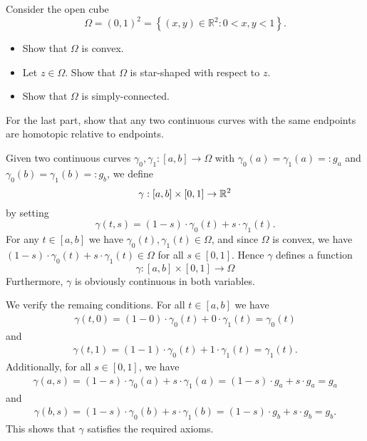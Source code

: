 \documentclass[11pt]{article}
\begin{document}
\begin{exercise}
    Consider the open cube 
    \[
        \Omega = (0,1)^2 = \left\{ (x,y) \in \mathbb R^2 : 0 < x,y < 1 \right\}. 
    \]
    \begin{itemize}
        \item Show that $\Omega$ is convex.
        \item Let $z \in \Omega$. Show that $\Omega$ is star-shaped with respect to $z$.
        \item Show that $\Omega$ is simply-connected.
    \end{itemize}
    For the last part, show that any two continuous curves with the same endpoints are homotopic relative to endpoints. 
\end{exercise}
\begin{solution}
    \item
    \item 
    \item 
    Given two continuous curves $\gamma_0, \gamma_1 : [a,b] \rightarrow \Omega$ with $\gamma_0(a) = \gamma_1(a) =: g_a$ and $\gamma_0(b) = \gamma_1(b) =: g_b$, we define 
    \[
        \gamma : [a,b] \times [0,1] \rightarrow \mathbb{R}^2
    \]
    by setting 
    \[
        \gamma(t,s) = (1-s) \cdot \gamma_0(t) + s \cdot \gamma_1(t).
    \]
    For any $t \in [a,b]$ we have $\gamma_0(t), \gamma_1(t) \in \Omega$,
    and since $\Omega$ is convex, we have $(1-s) \cdot \gamma_0(t) + s \cdot \gamma_1(t) \in \Omega$ for all $s \in [0,1]$.
    Hence $\gamma$ defines a function 
    \[
        \gamma : [a,b] \times [0,1] \rightarrow \Omega
    \]
    Furthermore, $\gamma$ is obviously continuous in both variables. 
    
    We verify the remaing conditions. For all $t \in [a,b]$ we have 
    \begin{align}
        \gamma(t,0) = (1-0) \cdot \gamma_0(t) + 0 \cdot \gamma_1(t) = \gamma_0(t)
    \end{align}
    and 
    \begin{align}
        \gamma(t,1) = (1-1) \cdot \gamma_0(t) + 1 \cdot \gamma_1(t) = \gamma_1(t)
        .
    \end{align}
    Additionally, for all $s \in [0,1]$, we have 
    \begin{align}
        \gamma(a,s) = (1-s) \cdot \gamma_0(a) + s \cdot \gamma_1(a) = (1-s) \cdot g_a + s \cdot g_a = g_a
    \end{align}
    and 
    \begin{align}
        \gamma(b,s) = (1-s) \cdot \gamma_0(b) + s \cdot \gamma_1(b) = (1-s) \cdot g_b + s \cdot g_b = g_b
        .
    \end{align}
    This shows that $\gamma$ satisfies the required axioms.
\end{solution}
\end{document}
